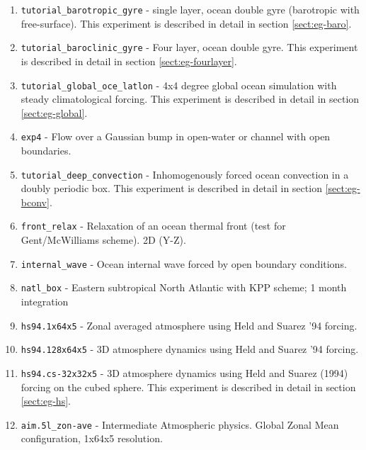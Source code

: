\begin{enumerate}
  
\item \texttt{tutorial\_barotropic\_gyre} - single layer, ocean double gyre 
  (barotropic with free-surface). This experiment is described in detail in section
  \ref{sect:eg-baro}.

\item \texttt{tutorial\_baroclinic\_gyre} - Four layer, ocean double gyre. This experiment
  is described in detail in section \ref{sect:eg-fourlayer}.

\item \texttt{tutorial\_global\_oce\_latlon} - 4x4 degree global ocean simulation with steady
  climatological forcing. This experiment is described in detail in section \ref{sect:eg-global}.

\item \texttt{exp4} - Flow over a Gaussian bump in open-water or channel with open boundaries.
  
\item \texttt{tutorial\_deep\_convection} - Inhomogenously forced ocean convection in a
  doubly periodic box. This experiment is described in detail in section \ref{sect:eg-bconv}.

\item \texttt{front\_relax} - Relaxation of an ocean thermal front (test for
Gent/McWilliams scheme). 2D (Y-Z).

\item \texttt{internal\_wave} - Ocean internal wave forced by open
  boundary conditions.
  
\item \texttt{natl\_box} - Eastern subtropical North Atlantic with KPP
  scheme; 1 month integration
  
\item \texttt{hs94.1x64x5} - Zonal averaged atmosphere using Held and
  Suarez '94 forcing.
  
\item \texttt{hs94.128x64x5} - 3D atmosphere dynamics using Held and
  Suarez '94 forcing.
  
\item \texttt{hs94.cs-32x32x5} - 3D atmosphere dynamics using Held and Suarez 
  (1994) forcing on the cubed sphere.  This experiment is described in detail in
  section \ref{sect:eg-hs}.
  
\item \texttt{aim.5l\_zon-ave} - Intermediate Atmospheric physics.
  Global Zonal Mean configuration, 1x64x5 resolution.
  

\end{enumerate}
